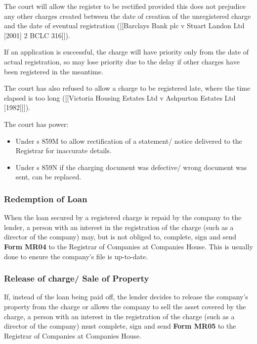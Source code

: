 \documentclass[
]{article}
\providecommand{\tightlist}{%
  \setlength{\itemsep}{0pt}\setlength{\parskip}{0pt}}
\begin{document}
The court will allow the register to be rectified provided this does not
prejudice any other charges created between the date of creation of the
unregistered charge and the date of eventual registration
({[}{[}Barclays Bank plc v Stuart Landon Ltd {[}2001{]} 2 BCLC
316{]}{]}).

If an application is successful, the charge will have priority only from
the date of actual registration, so may lose priority due to the delay
if other charges have been registered in the meantime.

The court has also refused to allow a charge to be registered late,
where the time elapsed is too long ({[}{[}Victoria Housing Estates Ltd v
Ashpurton Estates Ltd {[}1982{]}{]}{]}).

The court has power:

\begin{itemize}
\tightlist
\item
  Under s 859M to allow rectification of a statement/ notice delivered
  to the Registrar for inaccurate details.
\item
  Under s 859N if the charging document was defective/ wrong document
  was sent, can be replaced.
\end{itemize}

\hypertarget{redemption-of-loan}{%
\subsubsection{Redemption of Loan}\label{redemption-of-loan}}

When the loan secured by a registered charge is repaid by the company to
the lender, a person with an interest in the registration of the charge
(such as a director of the company) may, but is not obliged to,
complete, sign and send \textbf{Form MR04} to the Registrar of Companies
at Companies House. This is usually done to ensure the company's file is
up-to-date.

\hypertarget{release-of-charge-sale-of-property}{%
\subsubsection{Release of charge/ Sale of
Property}\label{release-of-charge-sale-of-property}}

If, instead of the loan being paid off, the lender decides to release
the company's property from the charge or allows the company to sell the
asset covered by the charge, a person with an interest in the
registration of the charge (such as a director of the company) must
complete, sign and send \textbf{Form MR05} to the Registrar of Companies
at Companies House.
\end{document}

